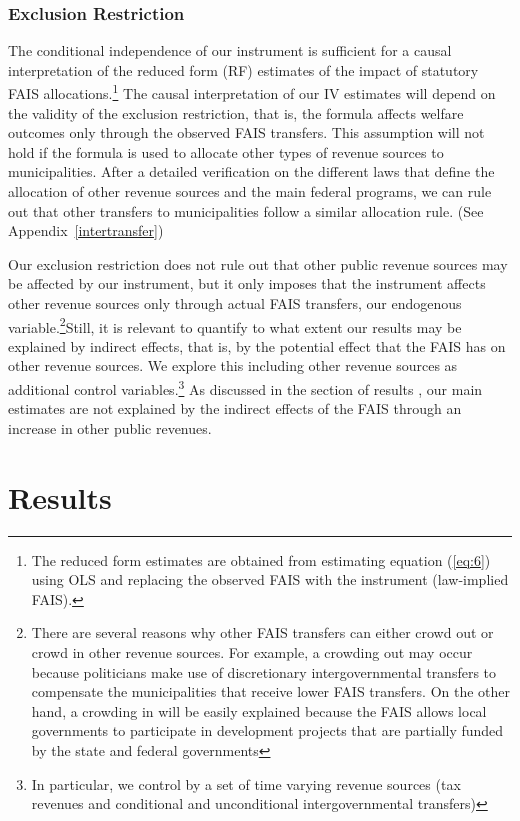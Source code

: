 \documentclass[dv_diss_main.tex]{subfiles}
\begin{document}
\subsubsection{Exclusion Restriction} The conditional independence of our instrument is sufficient for a causal interpretation of the reduced form (RF) estimates of the impact of statutory FAIS allocations.\footnote{The reduced form estimates are obtained from estimating equation (\ref{eq:6}) using OLS and replacing the observed FAIS with the instrument (law-implied FAIS).} The causal interpretation of our IV estimates will depend on the validity of the exclusion restriction, that is, the formula affects welfare outcomes only through the observed FAIS transfers. This assumption will not hold if the formula is used to allocate other types of revenue sources to municipalities. After a detailed verification on the different laws that define the allocation of other revenue sources and the main federal programs, we can rule out that other transfers to municipalities follow a similar allocation rule. (See  Appendix~\ref{intertransfer})

Our exclusion restriction does not rule out that other public revenue sources may be affected by our instrument, but it only imposes that the instrument affects other revenue sources only through actual FAIS transfers, our endogenous variable.\footnote{ There are several reasons why other FAIS transfers can either crowd out or crowd in other revenue sources. For example, a crowding out may occur because politicians make use of discretionary intergovernmental transfers to compensate the municipalities that receive lower FAIS transfers. On the other hand, a crowding in will be easily explained because the FAIS allows local governments to participate in development projects that are partially funded by the state and federal governments}Still, it is relevant to quantify to what extent our results may be explained by indirect effects, that is, by the potential effect that the FAIS has on other revenue sources. We explore this including other revenue sources as additional control variables.\footnote{ In particular, we control by a set of time varying revenue sources (tax revenues and conditional and unconditional intergovernmental transfers)} As discussed in the section of results , our main estimates are not explained by the indirect effects of the FAIS through an increase in other public revenues.



\section{Results} \label{sec:results}
\end{document}
